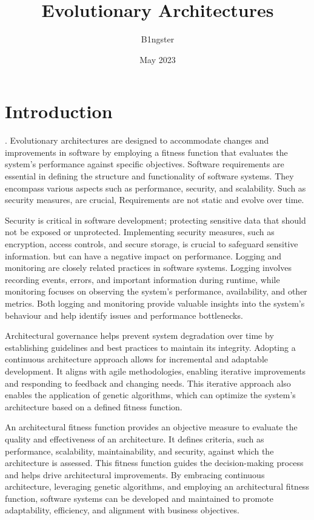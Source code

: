 \documentclass[main.tex]{subfiles}
\title{Evolutionary Architectures}
\author{B1ngster}
\date{May 2023}
\begin{document}
\maketitle

\section{Introduction}
. 
Evolutionary architectures are designed to accommodate changes and improvements in software by employing a fitness function that evaluates the system's performance against specific objectives. Software requirements are essential in defining the structure and functionality of software systems. They encompass various aspects such as performance, security, and scalability.  Such as security measures, are crucial,  Requirements are not static and evolve over time. 


Security is critical in software development; protecting sensitive data that should not be exposed or unprotected. Implementing  security measures, such as encryption, access controls, and secure storage, is crucial to safeguard sensitive information.  but can have a negative impact on performance.  Logging and monitoring are closely related practices in software systems. Logging involves recording events, errors, and important information during runtime, while monitoring focuses on observing the system's performance, availability, and other metrics. Both logging and monitoring provide valuable insights into the system's behaviour and help identify issues and performance bottlenecks.

Architectural governance helps prevent system degradation over time by establishing guidelines and best practices to maintain its integrity.
Adopting a continuous architecture approach allows for incremental and adaptable development. It aligns with agile methodologies, enabling iterative improvements and responding to feedback and changing needs. This iterative approach also enables the application of genetic algorithms, which can optimize the system's architecture based on a defined fitness function.

An architectural fitness function provides an objective measure to evaluate the quality and effectiveness of an architecture. It defines criteria, such as performance, scalability, maintainability, and security, against which the architecture is assessed. This fitness function guides the decision-making process and helps drive architectural improvements. By embracing continuous architecture, leveraging genetic algorithms, and employing an architectural fitness function, software systems can be developed and maintained to promote adaptability, efficiency, and alignment with business objectives.
\end{document}
